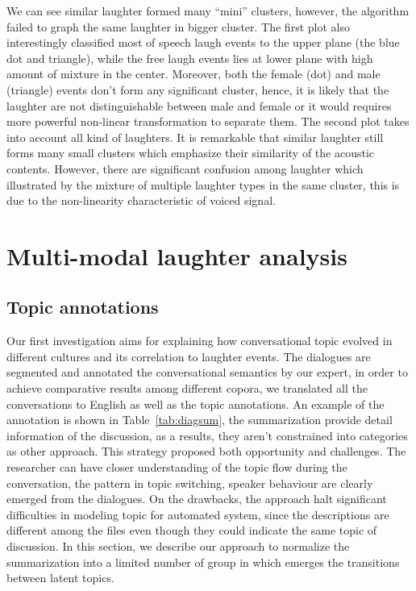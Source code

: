 \documentclass[10pt,journal,compsoc]{IEEEtran}
\begin{document}
We can see similar laughter formed many ``mini'' clusters, however, the algorithm failed to graph the same laughter in bigger cluster.
The first plot also interestingly classified most of speech laugh events to the upper plane (the blue dot and triangle), while the free laugh events lies at lower plane with high amount of mixture in the center. Moreover, both the female (dot) and male (triangle) events don't form any significant cluster, hence, it is likely that the laughter are not distinguishable between male and female or it would requires more powerful non-linear transformation to separate them.
The second plot takes into account all kind of laughters. It is remarkable that similar laughter still forms many small clusters which emphasize their similarity of the acoustic contents. However, there are significant confusion among laughter which illustrated by the mixture of multiple laughter types in the same cluster, this is due to the non-linearity characteristic of voiced signal.

\section{Multi-modal laughter analysis}
\label{sec:multi-modal laughter analysis}

\subsection{Topic annotations}
\label{sec:topic-annotations}
Our first investigation aims for explaining how conversational topic evolved in different cultures and its correlation to laughter events.
The dialogues are segmented and annotated the conversational semantics by our expert, in order to achieve comparative results among different copora, we translated all the conversations to English as well as the topic annotations. An example of the annotation is shown in Table~\ref{tab:diagsum}, the summarization provide detail information of the discussion, as a results, they aren't constrained into categories as other approach. This strategy proposed both opportunity and challenges. The researcher can have closer understanding of the topic flow during the conversation, the pattern in topic switching, speaker behaviour are clearly emerged from the dialogues. On the drawbacks, the approach halt significant difficulties in modeling topic for automated system, since the descriptions are different among the files even though they could indicate the same topic of discussion. In this section, we describe our approach to normalize the summarization into a limited number of group in which emerges the transitions between latent topics.
\end{document}
